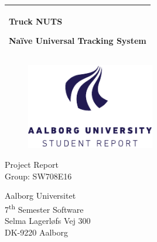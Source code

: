 %
\newcommand{\titlefont}{\sffamily\fontsize{36pt}{0pt}\selectfont}
\newcommand{\subtitlefont}{\sffamily\fontsize{26pt}{0pt}\selectfont}
\newcommand{\otherfont}{\sffamily\fontsize{18pt}{0pt}\selectfont}
\newcommand{\smallfont}{\sffamily\fontsize{12pt}{0pt}\selectfont}
\begin{titlepage}
    \addtolength{\hoffset}{0.5\evensidemargin-0.5\oddsidemargin} %
    \noindent%
    \begin{tabular}{@{}p{\textwidth}@{}}
        \toprule[2pt]
        \midrule
        \vspace{0.2cm}
        \begin{center}
        \titlefont Truck NUTS
        \end{center}
    \vspace{0.1cm}
        \begin{center}
        \subtitlefont Naïve Universal Tracking System
    \end{center}
        \vspace{0.2cm}\\
        \midrule
        \toprule[2pt]
    \end{tabular}
    \vspace{2 cm}
    \begin{figure}[h!]
        \centering
        \includegraphics[width=0.5\textwidth]{img/aau_logo_en.pdf}
    \end{figure}
    \vspace{3 cm}
    \begin{center}
        \otherfont
            Project Report
        \\
        \vspace{0.2cm}
        \otherfont
            Group: SW708E16
    \end{center}
    \vfill
    \begin{center}
    \smallfont
    Aalborg Universitet\\
    7\textsuperscript{th} Semester Software\\ \vspace{0.1cm}
    Selma Lagerløfs Vej 300\\
    DK-9220 Aalborg
    \end{center}
\end{titlepage}
\clearpage
\cleardoublepage
